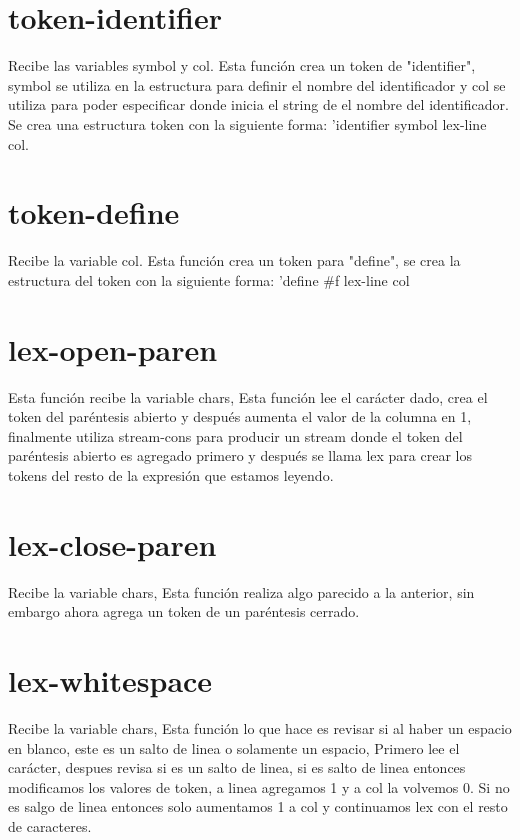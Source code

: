 \documentclass{article}
\begin{document}
\section{token-identifier}

Recibe las variables symbol y col. Esta función crea un token de "identifier", symbol se utiliza en la estructura para definir el nombre del identificador y col se utiliza para poder especificar donde inicia el string de el nombre del identificador. Se crea una estructura token con la siguiente forma:  'identifier symbol lex-line col.

\section{token-define}

Recibe la variable col. Esta función crea un token para "define", se crea la estructura del token con la siguiente forma: 'define \#f lex-line col

\section{lex-open-paren}

Esta función recibe la variable chars, Esta función lee el carácter dado, crea el token del paréntesis abierto y después aumenta el valor de la columna en 1, finalmente utiliza stream-cons para producir un stream donde el token del paréntesis abierto es agregado primero y después se llama lex para crear los tokens del resto de la expresión que estamos leyendo.

\section{lex-close-paren}

Recibe la variable chars, Esta función realiza algo parecido a la anterior, sin embargo ahora agrega un token de un paréntesis cerrado.

\section{lex-whitespace}

Recibe la variable chars, Esta función lo que hace es revisar si al haber un espacio en blanco, este es un salto de linea o solamente un espacio, Primero lee el carácter, despues revisa si es un salto de linea, si es salto de linea entonces modificamos los valores de token, a linea agregamos 1 y a col la volvemos 0. Si no es salgo de linea entonces solo aumentamos 1 a col y continuamos lex con el resto de caracteres.
\end{document}

